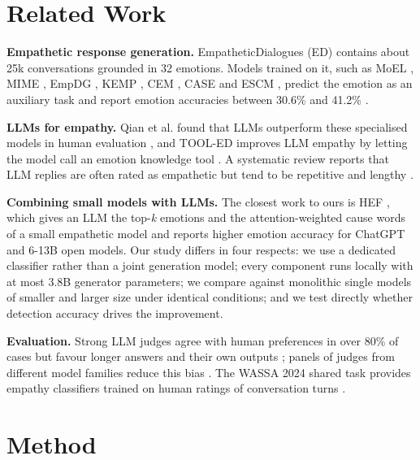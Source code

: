 \documentclass[conference,a4paper]{IEEEtran}
\begin{document}
\section{Related Work}
\textbf{Empathetic response generation.} EmpatheticDialogues (ED) \cite{b1} contains about 25k conversations grounded in 32 emotions. Models trained on it, such as MoEL \cite{b5}, MIME \cite{b9}, EmpDG \cite{b10}, KEMP \cite{b11}, CEM \cite{b6}, CASE \cite{b7} and ESCM \cite{b12}, predict the emotion as an auxiliary task and report emotion accuracies between 30.6\% and 41.2\% \cite{b2,b12}.

\textbf{LLMs for empathy.} Qian et al. found that LLMs outperform these specialised models in human evaluation \cite{b2}, and TOOL-ED improves LLM empathy by letting the model call an emotion knowledge tool \cite{b13}. A systematic review reports that LLM replies are often rated as empathetic but tend to be repetitive and lengthy \cite{b3}.

\textbf{Combining small models with LLMs.} The closest work to ours is HEF \cite{b8}, which gives an LLM the top-\emph{k} emotions and the attention-weighted cause words of a small empathetic model and reports higher emotion accuracy for ChatGPT and 6-13B open models. Our study differs in four respects: we use a dedicated classifier rather than a joint generation model; every component runs locally with at most 3.8B generator parameters; we compare against monolithic single models of smaller and larger size under identical conditions; and we test directly whether detection accuracy drives the improvement.

\textbf{Evaluation.} Strong LLM judges agree with human preferences in over 80\% of cases but favour longer answers and their own outputs \cite{b14,b15}; panels of judges from different model families reduce this bias \cite{b16}. The WASSA 2024 shared task provides empathy classifiers trained on human ratings of conversation turns \cite{b17}.


\section{Method}
\end{document}
